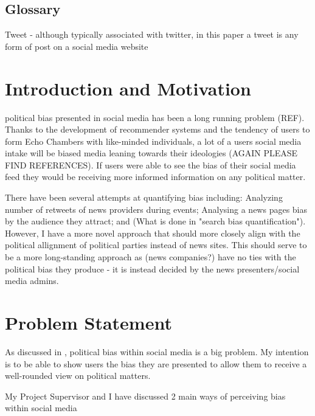 \documentclass[a4paper,fleqn,10pt]{article}
\begin{document}


\pagestyle{plain}

\subsection{Glossary}
Tweet - although typically associated with twitter, in this paper a tweet is any form of post on a social media website

\section{Introduction and Motivation}
\label{sec:intro}
political bias presented in social media has been a long running problem (REF).
Thanks to the development of recommender systems and the tendency of users to form Echo Chambers with like-minded individuals,
a lot of a users social media intake will be biased media leaning towards their ideologies (AGAIN PLEASE FIND REFERENCES).
If users were able to see the bias of their social media feed they would be receiving more informed information on any political matter.

There have been several attempts at quantifying bias including: Analyzing number of retweets of news providers during events;
Analysing a news pages bias by the audience they attract; and (What is done in "search bias quantification").
However, I have a more novel approach that should more closely align with the political allignment of political parties
instead of news sites. This should serve to be a more long-standing approach as (news companies?) have no ties with the political
bias they produce - it is instead decided by the news presenters/social media admins.

\section{Problem Statement}
\label{sec:problem}
As discussed in , political bias within social media is a big problem.
My intention is to be able to show users the bias they are presented to allow them to receive a well-rounded view
on political matters.

My Project Supervisor and I have discussed 2 main ways of perceiving bias within social media
\end{document}
